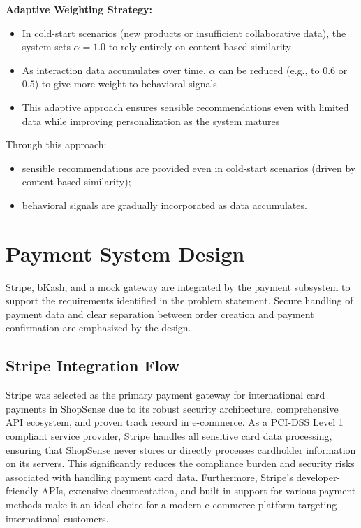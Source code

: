 \textbf{Adaptive Weighting Strategy:}
\begin{itemize}
  \item In cold-start scenarios (new products or insufficient collaborative data), the system sets $\alpha = 1.0$ to rely entirely on content-based similarity
  \item As interaction data accumulates over time, $\alpha$ can be reduced (e.g., to $0.6$ or $0.5$) to give more weight to behavioral signals
  \item This adaptive approach ensures sensible recommendations even with limited data while improving personalization as the system matures
\end{itemize}

Through this approach: 
\begin{itemize}
  \item sensible recommendations are provided even in cold-start scenarios (driven by content-based similarity);
  \item behavioral signals are gradually incorporated as data accumulates.
\end{itemize}

\section{Payment System Design}
Stripe, bKash, and a mock gateway are integrated by the payment subsystem to support the requirements identified in the problem statement. Secure handling of payment data and clear separation between order creation and payment confirmation are emphasized by the design.

\subsection{Stripe Integration Flow}

Stripe was selected as the primary payment gateway for international card payments in ShopSense due to its robust security architecture, comprehensive API ecosystem, and proven track record in e-commerce. As a PCI-DSS Level 1 compliant service provider, Stripe handles all sensitive card data processing, ensuring that ShopSense never stores or directly processes cardholder information on its servers. This significantly reduces the compliance burden and security risks associated with handling payment card data. Furthermore, Stripe's developer-friendly APIs, extensive documentation, and built-in support for various payment methods make it an ideal choice for a modern e-commerce platform targeting international customers.

